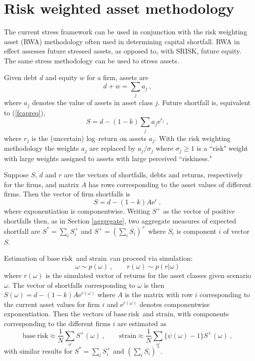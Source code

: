 \documentclass[authoryear]{elsarticle}
\newcommand{\e}{\mathrm{e}}
\newcommand{\br}{\ensuremath{\mathrm{base\ risk}}}
\newcommand{\pr}{\ensuremath{\mathrm{strain}}}
\newcommand{\eref}[1]{(\ref{#1})}
\newcommand{\sref}[1]{Section \ref{#1}}
\newcommand{\cq}{\ , \qquad}
\newcommand{\be}[1]{\begin{equation}\label{#1}}
\newcommand{\ee}{\end{equation}}
\begin{document}
\section{Risk weighted asset methodology}\label{riskmethod}

The current stress framework can be used in conjunction with   the  risk weighting asset (RWA) methodology often used in determining capital shortfall.   RWA in effect assesses future stressed assets,   as opposed to, with SRISK,  future equity.   The same stress methodology can be used to stress assets.

Given debt $d$ and equity $w$ for a firm,  assets are
$$
d+w=\sum_ja_j\ ,
$$
where $a_j$ denotes the value of assets in asset class $j$.   Future shortfall is, equivalent to \eref{fcapreq},  
\be{shortfall2}
S=  d-(1-k)\sum_ja_j\e^{r_j}\ ,
\ee
where $r_j$ is the (uncertain) log--return on assets $a_j$.  With the risk weighting methodology the weights $a_j$  are replaced by $a_j/\sigma_j$ where $\sigma_j\ge 1$ is a ``risk" weight with large  weights assigned to  assets  with large perceived ``riskiness." 

Suppose $S$, $d$ and $r$ are the vectors of shortfalls, debts  and returns, respectively for the firms, and matrix $A$ has rows corresponding to the asset values of different firms.  Then the vector of firm shortfalls is
$$
S = d-(1-k)A\e^{r}\ ,
$$ 
where  exponentiation is componentwise.   Writing $S^+$ as the vector of positive shortfalls then, as in \sref{aggregate}, two aggregate measures of expected shortfall are $S^*= \sum_iS_i^+$ and $S^+=(\sum_iS_i)^+$ where $S_i$ is component $i$ of vector $S$.

Estimation of \br\ and \pr\ can proceed via simulation:
$$
\omega\sim p(\omega)\cq r(\omega)\sim p(r|\omega)
$$
where $r(\omega)$ is  the simulated vector of returns for the asset classes given scenario $\omega$.   The vector of shortfalls corresponding to $\omega$ is then $S(\omega)=d-(1-k) A\e^{r(\omega)}$  where $A$ is the matrix with row $i$ corresponding to the current asset values for firm $i$ and $\e^{r(\omega)}$ denotes componentwise exponentiation.   Then the vectors of \br\ and \pr, with components corresponding to the different firms $i$ are estimated as  
\be{srisk4}
\br\approx \frac{1}{N}\sum_\omega S^+(\omega)\cq
 \pr\approx \frac{1}{N}\sum_\omega  \{\psi(\omega)-1\}S^+(\omega)\ ,
\ee
with similar results for $S^*=\sum_iS_i^+$ and $(\sum_iS_i)^+$.  
\end{document}

